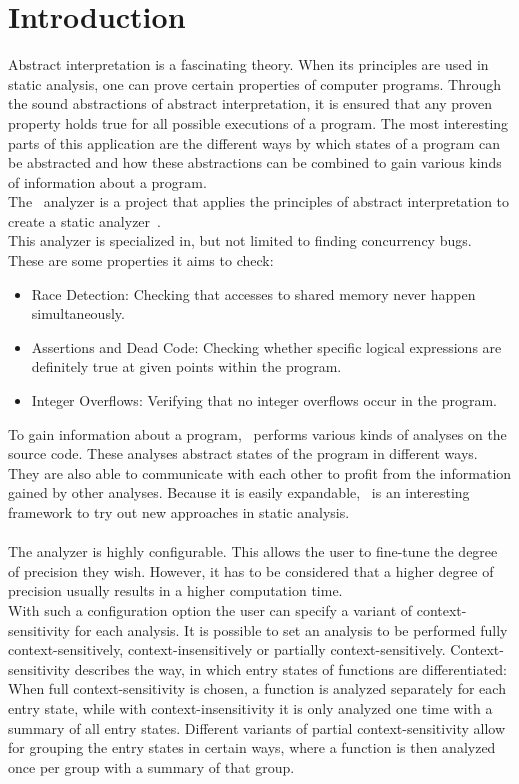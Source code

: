 
\chapter{Introduction}\label{chapter:introduction}
  Abstract interpretation is a fascinating theory. When its principles are used in static analysis, one can prove certain properties of computer programs. Through the sound abstractions of abstract interpretation, it is ensured that any proven property holds true for all possible executions of a program. The most interesting parts of this application are the different ways by which states of a program can be abstracted and how these abstractions can be combined to gain various kinds of information about a program.\\
  The \gob\ analyzer is a project that applies the principles of abstract interpretation to create a static analyzer~\parencite{goblintHome}.\\
  This analyzer is specialized in, but not limited to finding concurrency bugs. These are some properties it aims to check:
  \begin{itemize}
    \item Race Detection: Checking that accesses to shared memory never happen simultaneously.
    \item Assertions and Dead Code: Checking whether specific logical expressions are definitely true at given points within the program. 
    \item Integer Overflows: Verifying that no integer overflows occur in the program.
  \end{itemize}
  To gain information about a program, \gob\ performs various kinds of analyses on the source code. These analyses abstract states of the program in different ways. They are also able to communicate with each other to profit from the information gained by other analyses. Because it is easily expandable, \gob\ is an interesting framework to try out new approaches in static analysis.\\
  \\
  The analyzer is highly configurable. This allows the user to fine-tune the degree of precision they wish. However, it has to be considered that a higher degree of precision usually results in a higher computation time.\\
  With such a configuration option the user can specify a variant of context-sensitivity for each analysis. It is possible to set an analysis to be performed fully context-sensitively, context-insensitively or partially context-sensitively. Context-sensitivity describes the way, in which entry states of functions are differentiated: When full context-sensitivity is chosen, a function is analyzed separately for each entry state, while with context-insensitivity it is only analyzed one time with a summary of all entry states. Different variants of partial context-sensitivity allow for grouping the entry states in certain ways, where a function is then analyzed once per group with a summary of that group.

